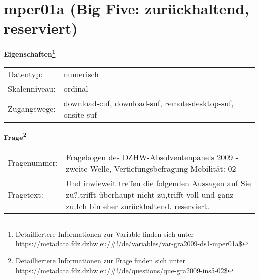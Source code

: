 
    \setcounter{footnote}{0}

    \vspace*{-1.8cm}
	\section{mper01a (Big Five: zurückhaltend, reserviert)}
	\label{section:mper01a}



    \vspace*{0.5cm}
    \noindent\textbf{Eigenschaften\footnote{Detailliertere Informationen zur Variable finden sich unter
		\url{https://metadata.fdz.dzhw.eu/\#!/de/variables/var-gra2009-ds1-mper01a$}}}\\
	\begin{tabularx}{\hsize}{@{}lX}
	Datentyp: & numerisch \\
	Skalenniveau: & ordinal \\
	Zugangswege: &
	  download-cuf, 
	  download-suf, 
	  remote-desktop-suf, 
	  onsite-suf
 \\
    \end{tabularx}



				\vspace*{0.5cm}
                \noindent\textbf{Frage\footnote{Detailliertere Informationen zur Frage finden sich unter
		              \url{https://metadata.fdz.dzhw.eu/\#!/de/questions/que-gra2009-ins5-02$}}}\\
				\begin{tabularx}{\hsize}{@{}lX}
					Fragenummer: &
					  Fragebogen des DZHW-Absolventenpanels 2009 - zweite Welle, Vertiefungsbefragung Mobilität:
					  02
 \\
					Fragetext: & Und inwieweit treffen die folgenden Aussagen auf Sie zu?,trifft überhaupt nicht zu,trifft voll und ganz zu,Ich bin eher zurückhaltend, reserviert. \\
				\end{tabularx}





